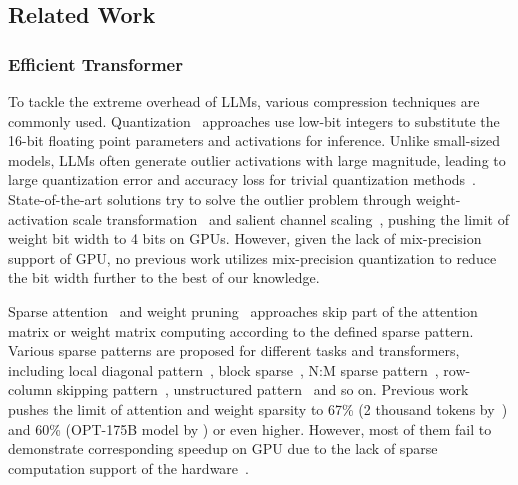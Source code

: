 \subsection{Related Work}
\subsubsection{Efficient Transformer}

To tackle the extreme overhead of LLMs, various compression techniques are commonly used.
Quantization~\citep{dettmers2022llm_int8, frantar2022gptq, yao2022zeroquant, xiao2023smoothquant,lin2023awq} approaches use low-bit integers to substitute the 16-bit floating point parameters and activations for inference. 
Unlike small-sized models, LLMs often generate outlier activations with large magnitude, leading to large quantization error and accuracy loss for trivial quantization methods~\citep{dettmers2022llm_int8}. 
State-of-the-art solutions try to solve the outlier problem through weight-activation scale transformation~\citep{xiao2023smoothquant} and salient channel scaling~\citep{lin2023awq}, pushing the limit of weight bit width to 4 bits on GPUs.
However, given the lack of mix-precision support of GPU, no previous work utilizes mix-precision quantization to reduce the bit width further to the best of our knowledge.

Sparse attention~\citep{child2019spTrans, zaheer2020bigbird, beltagy2020longformer, wang2021spatten, chen2023dynamic_nm} and weight pruning~\citep{frantar2023sparsegpt, kwon2022fast} approaches skip part of the attention matrix or weight matrix computing according to the defined sparse pattern. Various sparse patterns are proposed for different tasks and transformers, including local diagonal pattern~\citep{beltagy2020longformer}, block sparse~\citep{child2019spTrans, zaheer2020bigbird, kitaev2020reformer, kwon2022fast}, N:M sparse pattern~\citep{chen2023dynamic_nm, frantar2023sparsegpt}, row-column skipping pattern~\citep{wang2021spatten}, unstructured pattern~\citep{frantar2023sparsegpt} and so on.
Previous work pushes the limit of attention and weight sparsity to 67\% (2 thousand tokens by~\citep{zaheer2020bigbird}) and 60\% (OPT-175B model by \citep{frantar2023sparsegpt}) or even higher. However, most of them fail to demonstrate corresponding speedup on GPU due to the lack of sparse computation support of the hardware~\citep{tay2020LRA}.

